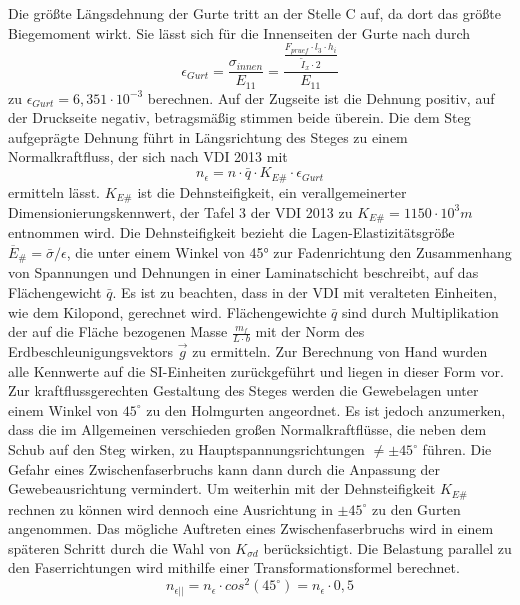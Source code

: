 \noindent Die größte Längsdehnung der Gurte tritt an der Stelle C auf, da dort das größte Biegemoment wirkt. Sie lässt sich für die Innenseiten der Gurte nach \cite{item16} durch
\begin{equation}
	\epsilon_{Gurt}=\frac{\sigma_{innen}}{E_{11}}=\frac{\frac{F_{pruef}\cdot l_{3}\cdot h_{i}}{\tilde{I}_{x}\cdot 2}}{E_{11}}
\end{equation}  
 zu $ \epsilon_{Gurt}=6,351\cdot 10^{-3} $ berechnen. Auf der Zugseite ist die Dehnung positiv, auf der Druckseite negativ, betragsmäßig stimmen beide überein. Die dem Steg aufgeprägte Dehnung führt in Längsrichtung des Steges zu einem Normalkraftfluss, der sich nach VDI 2013 mit
 \begin{equation}\label{ne}
 	n_{\epsilon}=n\cdot \bar{q}\cdot K_{E\#}\cdot \epsilon_{Gurt}
 \end{equation} 
ermitteln lässt. $ K_{E\#} $ ist die Dehnsteifigkeit, ein verallgemeinerter Dimensionierungskennwert, der Tafel 3 der VDI 2013 zu $ K_{E\#}=1150\cdot 10^{3}m $ entnommen wird. Die Dehnsteifigkeit bezieht die Lagen-Elastizitätsgröße $ \overline{E}_{\#}=\bar{\sigma}/ \epsilon $, die unter einem Winkel von 45° zur Fadenrichtung den Zusammenhang von Spannungen und Dehnungen in einer Laminatschicht beschreibt, auf das Flächengewicht $ \bar{q} $.
Es ist zu beachten, dass in der VDI mit veralteten Einheiten, wie dem Kilopond, gerechnet wird. Flächengewichte $ \bar{q} $ sind durch Multiplikation der auf die Fläche bezogenen Masse $ \frac{m_{f}}{L\cdot b} $ mit der Norm des Erdbeschleunigungsvektors $ \vec{g} $ zu ermitteln. Zur Berechnung von Hand wurden alle Kennwerte auf die SI-Einheiten zurückgeführt und liegen in dieser Form vor.\\

\noindent Zur kraftflussgerechten Gestaltung des Steges werden die Gewebelagen unter einem Winkel von $ 45^{\circ} $ zu den Holmgurten angeordnet. Es ist jedoch anzumerken, dass die im Allgemeinen verschieden großen Normalkraftflüsse, die neben dem Schub auf den Steg wirken, zu Hauptspannungsrichtungen $ \neq \pm 45^{\circ} $ führen. Die Gefahr eines Zwischenfaserbruchs kann dann durch die Anpassung der Gewebeausrichtung vermindert. Um weiterhin mit der Dehnsteifigkeit $ K_{E\#} $ rechnen zu können wird dennoch eine Ausrichtung in $ \pm 45^{\circ} $ zu den Gurten angenommen. Das mögliche Auftreten eines Zwischenfaserbruchs wird in einem späteren Schritt durch die Wahl von $ K_{\sigma d} $ berücksichtigt.  
Die Belastung parallel zu den Faserrichtungen wird mithilfe einer Transformationsformel berechnet.
\begin{equation}
	n_{\epsilon||}=n_{\epsilon}\cdot cos^{2}\left(45^{\circ} \right)=n_{\epsilon}\cdot 0,5 
\end{equation}


